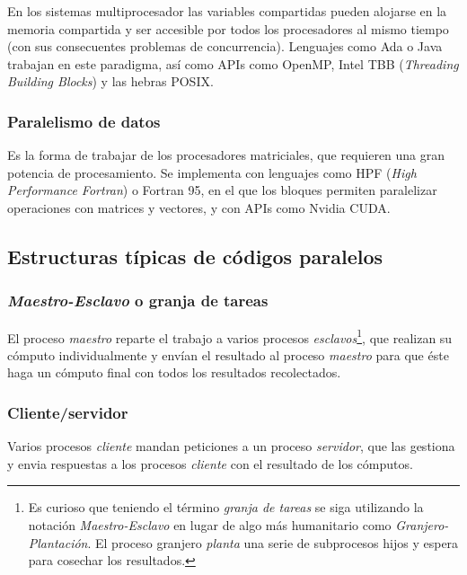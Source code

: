 En los sistemas multiprocesador las variables compartidas pueden alojarse en la memoria compartida y ser accesible por todos los procesadores al mismo tiempo (con sus consecuentes problemas de concurrencia).
Lenguajes como Ada o Java trabajan en este paradigma, así como APIs como OpenMP, Intel TBB (\textit{Threading Building Blocks}) y las hebras POSIX\@.

\subsubsection{Paralelismo de datos}

Es la forma de trabajar de los procesadores matriciales, que requieren una gran potencia de procesamiento.
Se implementa con lenguajes como HPF (\textit{High Performance Fortran}) o Fortran 95, en el que los bloques  permiten paralelizar operaciones con matrices y vectores, y con APIs como Nvidia CUDA\@.

\subsection{Estructuras típicas de códigos paralelos}\label{estructuras-codigos-paralelos}

\subsubsection{\textit{Maestro-Esclavo} o granja de tareas}

El proceso \textit{maestro} reparte el trabajo a varios procesos \textit{esclavos}\footnote{Es curioso que teniendo el término \textit{granja de tareas} se siga utilizando la notación \textit{Maestro-Esclavo} en lugar de algo más humanitario como \textit{Granjero-Plantación}. El proceso granjero \textit{planta} una serie de subprocesos hijos y espera para cosechar los resultados.}, que realizan su cómputo individualmente y envían el resultado al proceso \textit{maestro} para que éste haga un cómputo final con todos los resultados recolectados.

\subsubsection{Cliente/servidor}

Varios procesos \textit{cliente} mandan peticiones a un proceso \textit{servidor}, que las gestiona y envia respuestas a los procesos \textit{cliente} con el resultado de los cómputos.


